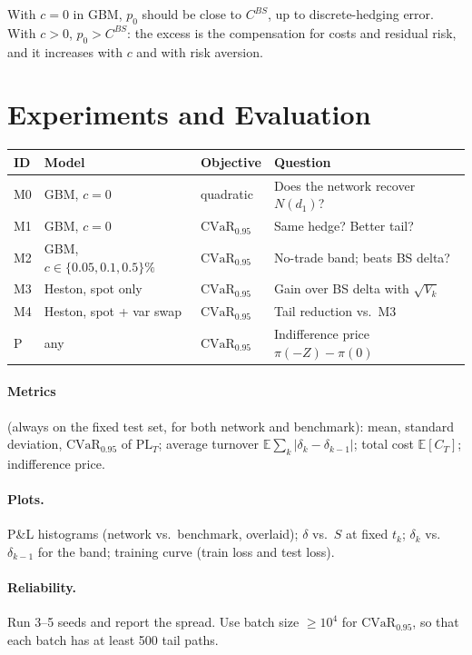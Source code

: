 \documentclass[11pt]{article}
\theoremstyle{definition}
\theoremstyle{remark}
\newcommand{\E}{\mathbb{E}}
\newcommand{\PL}{\mathrm{PL}}
\newcommand{\CVaR}{\mathrm{CVaR}}
\begin{document}
With $c=0$ in GBM, $p_0$ should be close to $C^{BS}$, up to discrete-hedging error. With $c>0$, $p_0>C^{BS}$:
the excess is the compensation for costs and residual risk, and it increases with $c$ and with risk aversion.

\section{Experiments and Evaluation}\label{sec:exp}

\begin{center}
\renewcommand{\arraystretch}{1.35}
\begin{tabular}{@{}llll@{}}
\toprule
ID & Model & Objective & Question\\
\midrule
M0 & GBM, $c=0$ & quadratic & Does the network recover $N(d_1)$?\\
M1 & GBM, $c=0$ & $\CVaR_{0.95}$ & Same hedge? Better tail?\\
M2 & GBM, $c\in\{0.05,0.1,0.5\}\%$ & $\CVaR_{0.95}$ & No-trade band; beats BS delta?\\
M3 & Heston, spot only & $\CVaR_{0.95}$ & Gain over BS delta with $\sqrt{V_k}$\\
M4 & Heston, spot + var swap & $\CVaR_{0.95}$ & Tail reduction vs.\ M3\\
P & any & $\CVaR_{0.95}$ & Indifference price $\pi(-Z)-\pi(0)$\\
\bottomrule
\end{tabular}
\end{center}

\paragraph{Metrics} (always on the fixed test set, for both network and benchmark):
mean, standard deviation, $\CVaR_{0.95}$ of $\PL_T$; average turnover $\E\sum_k|\delta_k-\delta_{k-1}|$; total cost $\E[C_T]$;
indifference price.

\paragraph{Plots.} P\&L histograms (network vs.\ benchmark, overlaid); $\delta$ vs.\ $S$ at fixed $t_k$; $\delta_k$ vs.\ $\delta_{k-1}$ for the band;
training curve (train loss and test loss).

\paragraph{Reliability.} Run 3--5 seeds and report the spread. Use batch size $\ge10^4$ for $\CVaR_{0.95}$, so that each batch has at least 500 tail paths.
\end{document}
